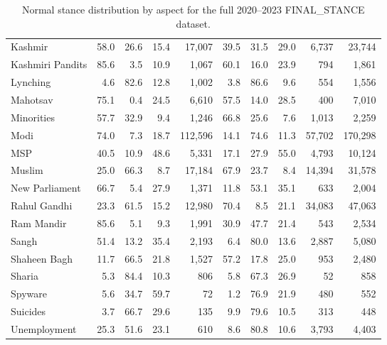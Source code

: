 \begin{table}[htbp]
\begin{tabular}{lrrrrrrrrr}
Kashmir & 58.0 & 26.6 & 15.4 & 17,007 & 39.5 & 31.5 & 29.0 & 6,737 & 23,744 \\
Kashmiri Pandits & 85.6 & 3.5 & 10.9 & 1,067 & 60.1 & 16.0 & 23.9 & 794 & 1,861 \\
Lynching & 4.6 & 82.6 & 12.8 & 1,002 & 3.8 & 86.6 & 9.6 & 554 & 1,556 \\
Mahotsav & 75.1 & 0.4 & 24.5 & 6,610 & 57.5 & 14.0 & 28.5 & 400 & 7,010 \\
Minorities & 57.7 & 32.9 & 9.4 & 1,246 & 66.8 & 25.6 & 7.6 & 1,013 & 2,259 \\
Modi & 74.0 & 7.3 & 18.7 & 112,596 & 14.1 & 74.6 & 11.3 & 57,702 & 170,298 \\
MSP & 40.5 & 10.9 & 48.6 & 5,331 & 17.1 & 27.9 & 55.0 & 4,793 & 10,124 \\
Muslim & 25.0 & 66.3 & 8.7 & 17,184 & 67.9 & 23.7 & 8.4 & 14,394 & 31,578 \\
New Parliament & 66.7 & 5.4 & 27.9 & 1,371 & 11.8 & 53.1 & 35.1 & 633 & 2,004 \\
Rahul Gandhi & 23.3 & 61.5 & 15.2 & 12,980 & 70.4 & 8.5 & 21.1 & 34,083 & 47,063 \\
Ram Mandir & 85.6 & 5.1 & 9.3 & 1,991 & 30.9 & 47.7 & 21.4 & 543 & 2,534 \\
Sangh & 51.4 & 13.2 & 35.4 & 2,193 & 6.4 & 80.0 & 13.6 & 2,887 & 5,080 \\
Shaheen Bagh & 11.7 & 66.5 & 21.8 & 1,527 & 57.2 & 17.8 & 25.0 & 953 & 2,480 \\
Sharia & 5.3 & 84.4 & 10.3 & 806 & 5.8 & 67.3 & 26.9 & 52 & 858 \\
Spyware & 5.6 & 34.7 & 59.7 & 72 & 1.2 & 76.9 & 21.9 & 480 & 552 \\
Suicides & 3.7 & 66.7 & 29.6 & 135 & 9.9 & 79.6 & 10.5 & 313 & 448 \\
Unemployment & 25.3 & 51.6 & 23.1 & 610 & 8.6 & 80.8 & 10.6 & 3,793 & 4,403 \\
\bottomrule
\end{tabular}
\caption{Normal stance distribution by aspect for the full 2020--2023 FINAL\_STANCE dataset.}
\label{tab:normal-full-keyword-stance}
\end{table}

